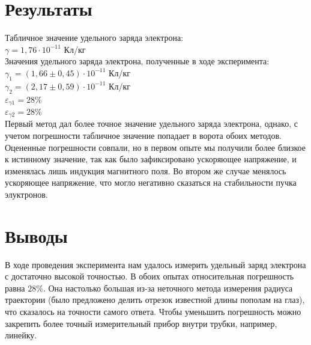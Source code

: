 \documentclass[12pt]{article}
\begin{document}
	\section{Результаты}
	Табличное значение удельного заряда электрона:\\
	$\displaystyle\gamma=1,76\cdot10^{-11}$ Кл/кг\\
	Значения удельного заряда электрона, полученные в ходе эксперимента:\\
	$\displaystyle\gamma_1=\left(1,66\pm0,45\right)\cdot10^{-11}$ Кл/кг\\
	$\displaystyle\gamma_2=\left(2,17\pm0,59\right)\cdot10^{-11}$ Кл/кг\\
	$\varepsilon_{\gamma1}=28\%$\\
	$\varepsilon_{\gamma2}=28\%$\\
	Первый метод дал более точное значение удельного заряда электрона, однако, с учетом погрешности табличное значение попадает в ворота обоих методов.\\
	Оцененные погрешности совпали, но в первом опыте мы получили более близкое к истинному значение, так как было зафиксировано ускоряющее напряжение, и изменялась лишь индукция магнитного поля. Во втором же случае менялось ускоряющее напряжение, что могло негативно сказаться на стабильности пучка элуктронов.
	\section{Выводы}
	В ходе проведения эксперимента нам удалось измерить удельный заряд электрона с достаточно высокой точностью. В обоих опытах относительная погрешность равна $28\%$. Она настолько большая из-за неточного метода измерения радиуса траектории (было предложено делить отрезок известной длины пополам на глаз), что сказалось на точности самого ответа. Чтобы уменьшить погрешность можно закрепить более точный измерительный прибор внутри трубки, например, линейку.
\end{document}
